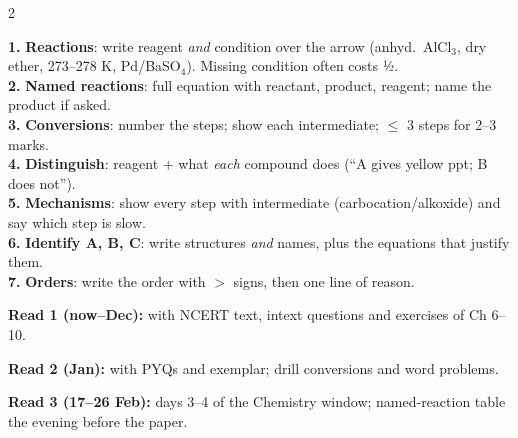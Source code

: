 \documentclass[10pt,a4paper]{extarticle}
\begin{document}
\begin{multicols}{2}
\columnbreak
{}
\begin{kbox}\small
\textbf{1.} \textbf{Reactions}: write reagent \emph{and} condition over the arrow (anhyd.\ AlCl$_3$, dry ether, 273--278 K, Pd/BaSO$_4$). Missing condition often costs ½.\\
\textbf{2.} \textbf{Named reactions}: full equation with reactant, product, reagent; name the product if asked.\\
\textbf{3.} \textbf{Conversions}: number the steps; show each intermediate; $\le$ 3 steps for 2--3 marks.\\
\textbf{4.} \textbf{Distinguish}: reagent + what \emph{each} compound does (``A gives yellow ppt; B does not'').\\
\textbf{5.} \textbf{Mechanisms}: show every step with intermediate (carbocation/alkoxide) and say which step is slow.\\
\textbf{6.} \textbf{Identify A, B, C}: write structures \emph{and} names, plus the equations that justify them.\\
\textbf{7.} \textbf{Orders}: write the order with $>$ signs, then one line of reason.
\end{kbox}
\begin{fl}
\item \textbf{Read 1 (now–Dec):} with NCERT text, intext questions and exercises of Ch 6--10.
\item \textbf{Read 2 (Jan):} with PYQs and exemplar; drill conversions and word problems.
\item \textbf{Read 3 (17--26 Feb):} days 3--4 of the Chemistry window; named-reaction table the evening before the paper.
\end{fl}
\end{multicols}
\end{document}
